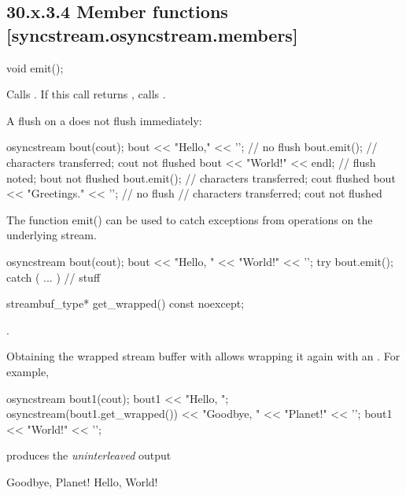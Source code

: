 \documentclass[ebook,11pt,article]{memoir}
\begin{document}
\subsection{30.x.3.4 Member functions [syncstream.osyncstream.members]}
\begin{addedblock}

\begin{itemdecl}
void emit();
\end{itemdecl}

\begin{itemdescr}
\pnum
\effects 
Calls . If this call returns , calls .

\begin{example}
A flush on a  does not flush immediately:
\begin{codeblock}
{
  osyncstream bout(cout);
  bout << "Hello," << '\n'; // no flush
  bout.emit(); // characters transferred; cout not flushed
  bout << "World!" << endl; // flush noted; bout not flushed
  bout.emit(); // characters transferred; cout flushed
  bout << "Greetings." << '\n'; // no flush
} // characters transferred; cout not flushed
\end{codeblock}
\end{example}

\begin{example}
The function emit() can be used to catch exceptions from operations on the underlying stream.
\begin{codeblock}
{
  osyncstream bout(cout);
  bout << "Hello, " << "World!" << '\n';
  try {
    bout.emit();
  } catch ( ... ) {
    // stuff
  }
}
\end{codeblock}
\end{example}
\end{itemdescr}

\begin{itemdecl}
streambuf_type* get_wrapped() const noexcept;
\end{itemdecl}

\begin{itemdescr}
\pnum
\returns 
{}.

\begin{example}
Obtaining the wrapped stream buffer with  allows wrapping it again with an . For example,
\begin{codeblock}
{
  osyncstream bout1(cout);
  bout1 << "Hello, ";
  {
    osyncstream(bout1.get_wrapped()) << "Goodbye, " << "Planet!" << '\n';
  }
  bout1 << "World!" << '\n';
}
\end{codeblock}
produces the \emph{uninterleaved} output
\begin{codeblock}
Goodbye, Planet!
Hello, World!
\end{codeblock}
\end{example}

\end{itemdescr}


\end{addedblock}
\end{document}
